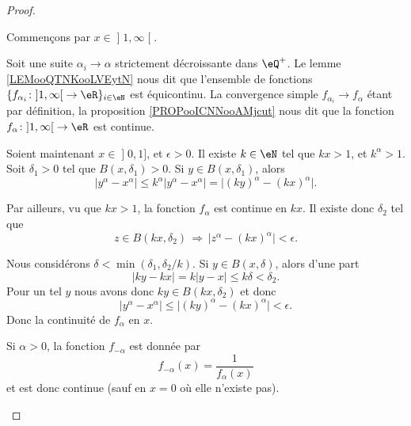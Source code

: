\begin{proof}
\begin{subproof}
\begin{subproof}
			Commençons par \( x\in \mathopen\rbrack 1 , \infty \mathclose\lbrack\).

			Soit une suite \( \alpha_i\to \alpha\) strictement décroissante dans \( \eQ^+\). Le lemme \ref{LEMooQTNKooLVEytN} nous dit que l'ensemble de fonctions  \( \{ f_{\alpha_i}\colon \mathopen] 1 , \infty \mathclose[\to \eR \}_{i\in \eN}\) est équicontinu. La convergence simple \( f_{\alpha_i}\to f_{\alpha}\) étant par définition, la proposition \ref{PROPooICNNooAMjcut} nous dit que la fonction \( f_{\alpha}\colon \mathopen] 1 , \infty \mathclose[\to \eR\) est continue.


				Soient maintenant \( x\in \mathopen] 0 , 1 \mathclose]\), et \( \epsilon>0\). Il existe \( k\in \eN\) tel que \( kx>1\), et \( k^{\alpha}>1\). Soit \( \delta_1>0\) tel que \( B(x,\delta_1)>0\). Si \( y\in B(x,\delta_1)\), alors
			\begin{equation}
				| y^{\alpha}-x^{\alpha} |\leq k^{\alpha}| y^{\alpha}-x^{\alpha} |=\big| (ky)^{\alpha}-(kx)^{\alpha} \big|.
			\end{equation}

			Par ailleurs, vu que \( kx>1\), la fonction \( f_{\alpha}\) est continue en \( kx\). Il existe donc \( \delta_2\) tel que
			\begin{equation}
				z\in B(kx,\delta_2)\,\Rightarrow\,\big| z^{\alpha}-(kx)^{\alpha} \big|<\epsilon.
			\end{equation}

			Nous considérons \( \delta<\min(\delta_1,\delta_2/k)\). Si \( y\in B(x,\delta)\), alors d'une part
			\begin{equation}
				| ky-kx |=k| y-x |\leq k\delta<\delta_2.
			\end{equation}
			Pour un tel \( y\) nous avons donc \( ky\in B(kx,\delta_2)\) et donc
			\begin{equation}
				| y^{\alpha}-x^{\alpha} |\leq \big| (ky)^{\alpha}-(kx)^{\alpha} \big|<\epsilon.
			\end{equation}
			Donc la continuité de \( f_{\alpha}\) en \( x\).

		\end{subproof}


		Si \( \alpha>0\), la fonction \( f_{-\alpha}\) est donnée par
		\begin{equation}
			f_{-\alpha}(x)=\frac{1}{  f_{\alpha}(x) }
		\end{equation}
		et est donc continue (sauf en \( x=0\) où elle n'existe pas).
	\end{subproof}
\end{proof}

